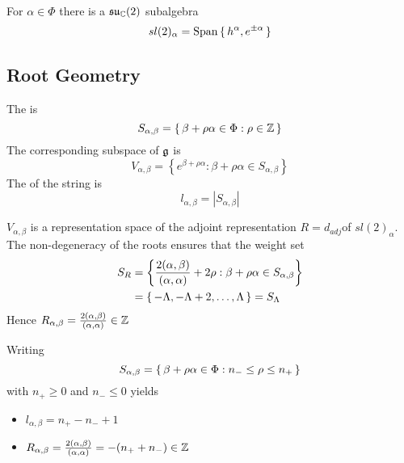\documentclass{article}
\begin{document}
\begin{definition}[$sl(2)_\alpha$]
For $\alpha\in\Phi$ there is a $\mathfrak{su}_{\mathbb{C}}(2)$ subalgebra 
\[
sl(2)_\alpha=\operatorname{Span}\set{  h^\alpha, e^{\pm\alpha} }
\]
\end{definition}


\subsection{Root Geometry}

\begin{definition}
The  is 
\[
S_{\alpha, \beta}=\set{  \beta+\rho\alpha\in\Phi : \rho\in\mathbb{Z}  }
\]
The corresponding subspace of $\mathfrak{g}$ is 
\[
V_{\alpha, \beta}=\left\{ e^{\beta+\rho\alpha} : \beta+\rho\alpha\in S_{\alpha, \beta} \right\}
\]
The  of the string is 
\[
l_{\alpha,\beta}=|S_{\alpha,\beta}|
\]
\end{definition}
\begin{fact}
$V_{\alpha, \beta}$ is a representation space of the adjoint representation $R=d_{adj}$of $sl(2)_\alpha$. The non-degeneracy of the roots ensures that the weight set 
\begin{align*}
    S_R &= \left\{ \frac{2(\alpha,\beta)}{(\alpha,\alpha)}+2\rho : \beta+\rho\alpha\in S_{\alpha, \beta} \right\} \\
     &= \set{  -\Lambda,-\Lambda+2,\dots,\Lambda }=S_\Lambda \\
\end{align*}
Hence $R_{\alpha,\beta}=\frac{2(\alpha,\beta)}{(\alpha,\alpha)} \in\mathbb{Z}$
\end{fact}

\begin{fact}
Writing
\[
S_{\alpha, \beta}=\set{  \beta+\rho\alpha\in\Phi : n_- \leq \rho \leq n_+  }
\]
with $n_+ \geq 0$ and $n_- \leq 0$ yields
\begin{itemize}
    \item $l_{\alpha,\beta}=n_+-n_-+1$
    \item $R_{\alpha,\beta}=\frac{2(\alpha,\beta)}{(\alpha,\alpha)} = -(n_+ + n_-) \in\mathbb{Z}$
\end{itemize}
\end{fact}
\end{document}

